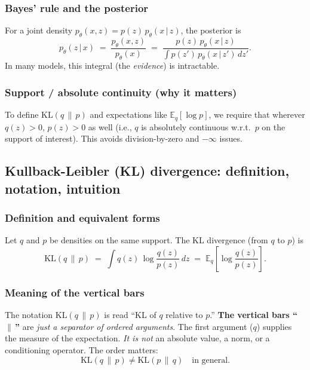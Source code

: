 \documentclass[11pt]{article}
\newcommand{\E}{\mathbb{E}}
\newcommand{\KL}{\mathrm{KL}}
\newcommand{\given}{\,\vert\,}
\theoremstyle{remark}
\begin{document}
\subsubsection*{Bayes' rule and the posterior}
For a joint density $p_\theta(x,z)=p(z)\,p_\theta(x\given z)$, the posterior is
\[
p_\theta(z\given x) \;=\; \frac{p_\theta(x,z)}{p_\theta(x)} \;=\; \frac{p(z)\,p_\theta(x\given z)}{\int p(z')\,p_\theta(x\given z')\,dz'}.
\]
In many models, this integral (the \emph{evidence}) is intractable.

\subsubsection*{Support / absolute continuity (why it matters)}
To define $\KL(q\,\|\,p)$ and expectations like $\E_q[\log p]$, we require that wherever $q(z)>0$, $p(z)>0$ as well (i.e., $q$ is absolutely continuous w.r.t.\ $p$ on the support of interest). This avoids division-by-zero and $-\infty$ issues.

\subsection{Kullback-Leibler (KL) divergence: definition, notation, intuition}
\subsubsection*{Definition and equivalent forms}
Let $q$ and $p$ be densities on the same support. The KL divergence (from $q$ to $p$) is
\[
\KL(q\,\|\,p) \;=\; \int q(z)\,\log\frac{q(z)}{p(z)}\,dz
\;=\; \E_{q}\!\left[\log\frac{q(z)}{p(z)}\right].
\]

\subsubsection*{Meaning of the vertical bars}
The notation $\KL(q\,\|\,p)$ is read ``KL of $q$ relative to $p$.'' \textbf{The vertical bars ``$\|\,$''} are \emph{just a separator of ordered arguments}. The first argument ($q$) supplies the measure of the expectation. \emph{It is not} an absolute value, a norm, or a conditioning operator. The order matters:
\[
\KL(q\,\|\,p) \neq \KL(p\,\|\,q) \quad\text{in general.}
\]
\end{document}
